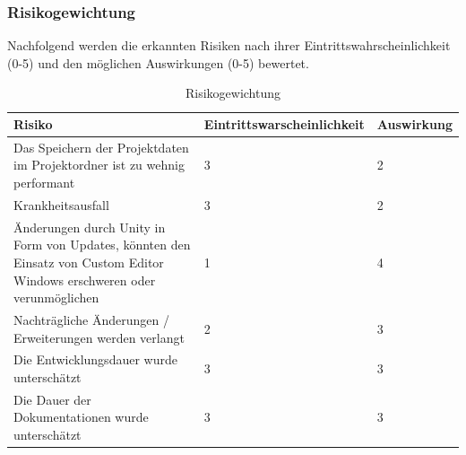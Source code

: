 \subsubsection{Risikogewichtung}
Nachfolgend werden die erkannten Risiken nach ihrer Eintrittswahrscheinlichkeit (0-5) und den 
möglichen Auswirkungen (0-5) bewertet.\\
\begin{table}[H]
    \centering
    \settowidth{}
    \setlength\extrarowheight{2pt}
    \begin{tabulary}{1.0\textwidth}{|L|L|L|}
      \hline
      \textbf{Risiko} &
      \textbf{Eintrittswarscheinlichkeit}&
      \textbf{Auswirkung}\\
      \hline
      Das Speichern der Projektdaten im Projektordner ist zu wehnig performant &
      3 &
      2\\
      \hline
      Krankheitsausfall &
      3 &
      2\\
      \hline
      Änderungen durch Unity in Form von Updates, könnten den Einsatz von Custom Editor Windows erschweren oder verunmöglichen &
      1 &
      4\\
      \hline
      Nachträgliche Änderungen / Erweiterungen werden verlangt &
      2 &
      3\\
      \hline
      Die Entwicklungsdauer wurde unterschätzt &
      3 &
      3\\
      \hline
      Die Dauer der Dokumentationen wurde unterschätzt &
      3 &
      3\\
      \hline
    \end{tabulary}
    \caption{Risikogewichtung}
  \end{table}

